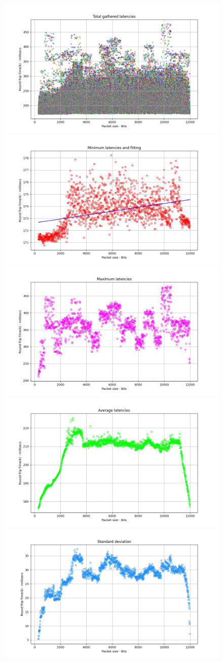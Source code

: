 \begin{figure}
    \centering
    \includegraphics[width = .9\textwidth]{hw-2/report/imgs/250-instances/la-total-latencies.png}
    \includegraphics[width = .49\textwidth]{hw-2/report/imgs/250-instances/la-min-latencies.png}
    \includegraphics[width = .49\textwidth]{hw-2/report/imgs/250-instances/la-max-latencies.png}
    \includegraphics[width = .49\textwidth]{hw-2/report/imgs/250-instances/la-avg-latencies.png}
    \includegraphics[width = .49\textwidth]{hw-2/report/imgs/250-instances/la-standard-deviation.png}
\end{figure}




